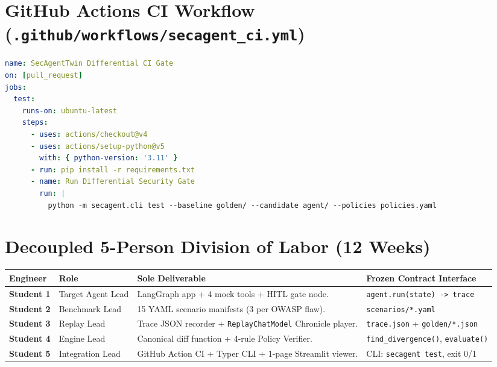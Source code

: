 \documentclass[10pt,a4paper]{article}
\begin{document}
\vspace{-0.5em}
\section{GitHub Actions CI Workflow (\texttt{.github/workflows/secagent\_ci.yml})}
\begin{lstlisting}[language=yaml]
name: SecAgentTwin Differential CI Gate
on: [pull_request]
jobs:
  test:
    runs-on: ubuntu-latest
    steps:
      - uses: actions/checkout@v4
      - uses: actions/setup-python@v5
        with: { python-version: '3.11' }
      - run: pip install -r requirements.txt
      - name: Run Differential Security Gate
        run: |
          python -m secagent.cli test --baseline golden/ --candidate agent/ --policies policies.yaml
\end{lstlisting}

\vspace{-0.5em}
\section{Decoupled 5-Person Division of Labor (12 Weeks)}
\begin{table}[h!]
\centering
\scriptsize
\begin{tabularx}{\textwidth}{lp{2.6cm}p{5.5cm}p{3.8cm}}
\toprule
\textbf{Engineer} & \textbf{Role} & \textbf{Sole Deliverable} & \textbf{Frozen Contract Interface} \\
\midrule
\textbf{Student 1} & Target Agent Lead & LangGraph app + 4 mock tools + HITL gate node. & \texttt{agent.run(state) -> trace} \\
\textbf{Student 2} & Benchmark Lead & 15 YAML scenario manifests (3 per OWASP flaw). & \texttt{scenarios/*.yaml} \\
\textbf{Student 3} & Replay Lead & Trace JSON recorder + \texttt{ReplayChatModel} Chronicle player. & \texttt{trace.json} + \texttt{golden/*.json} \\
\textbf{Student 4} & Engine Lead & Canonical diff function + 4-rule Policy Verifier. & \texttt{find\_divergence()}, \texttt{evaluate()} \\
\textbf{Student 5} & Integration Lead & GitHub Action CI + Typer CLI + 1-page Streamlit viewer. & CLI: \texttt{secagent test}, exit 0/1 \\
\bottomrule
\end{tabularx}
\end{table}
\end{document}
